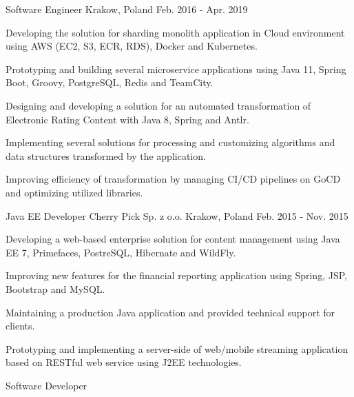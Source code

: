 \begin{cventries}
  \cventry
    {Software Engineer} %
    { } %
    {Krakow, Poland} %
    {Feb. 2016 - Apr. 2019} %
    {
      \begin{cvitems} %
        \item {Developing the solution for sharding monolith application in Cloud environment using AWS (EC2, S3, ECR, RDS), Docker and Kubernetes.}
        \item {Prototyping and building several microservice applications using Java 11, Spring Boot, Groovy, PostgreSQL, Redis and TeamCity.}
        \item {Designing and developing a solution for an automated transformation of Electronic Rating Content with Java 8, Spring and Antlr.}
        \item {Implementing several solutions for processing and customizing algorithms and data structures transformed by the application.}
        \item {Improving efficiency of transformation by managing CI/CD pipelines on GoCD and optimizing utilized libraries.}
      \end{cvitems}
    }
\break
  \cventry
    {Java EE Developer} %
    {Cherry Pick Sp. z o.o.} %
    {Krakow, Poland} %
    {Feb. 2015 - Nov. 2015} %
    {
      \begin{cvitems} %
        \item {Developing a web-based enterprise solution for content management using
Java EE 7, Primefaces, PostreSQL, Hibernate and WildFly.}
		\item {Improving new features for the financial reporting application using Spring, JSP, Bootstrap and MySQL.}
		\item {Maintaining a production Java application and provided technical support for clients.}
        \item {Prototyping and implementing a server-side of web/mobile
streaming application based on RESTful web service using J2EE technologies.}
      \end{cvitems}
    }
\break
  \cventry
    {Software Developer} %

\end{cventries}
